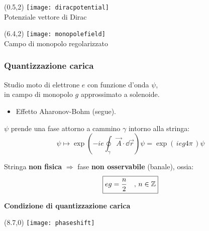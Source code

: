 \begin{frame}

\begin{textblock}{15}(0.5,2)
{
   \texttt{[image: diracpotential]}\\
   {\hspace*{7mm} Potenziale vettore di Dirac}
}

\begin{textblock}{15}(6.4,2)
{
   \texttt{[image: monopolefield]}\\
   \hspace*{1mm}Campo di monopolo regolarizzato
}
\end{textblock}

\end{textblock}

\end{frame}


\begin{frame}
\frametitle{Quantizzazione carica}
{\small Studio moto di elettrone $e$ con funzione d'onda $\psi$,  \\in campo di monopolo $g$ approssimato
a solenoide.}\\
\begin{itemize}
\item Effetto Aharonov-Bohm (segue).
\end{itemize}
$\psi$ prende una fase attorno a cammino $\gamma$ intorno alla stringa:
$$
   \psi \mapsto \exp\left(-ie \oint_\gamma \vec A \cdot \dd \vec r \right) \psi
      = \exp(\, ieg4\pi \,) \psi
$$

Stringa \textbf{non fisica} $\Rightarrow$ fase \textbf{non osservabile} (banale),
ossia:
$$
   \boxed{eg = \frac{n}{2} \quad, \,  n \in \mathbb{Z}}
$$
\begin{center}\textbf{
   Condizione di quantizzazione carica
}\end{center}

\begin{textblock}{10}(8.7,0){
      \texttt{[image: phaseshift]}
}\end{textblock}

\end{frame}

